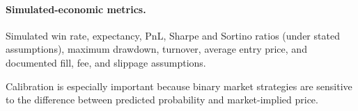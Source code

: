 \paragraph{Simulated-economic metrics.}
Simulated win rate, expectancy, PnL, Sharpe and Sortino ratios (under stated
assumptions), maximum drawdown, turnover, average entry price, and documented
fill, fee, and slippage assumptions.

Calibration is especially important because binary market strategies are
sensitive to the difference between predicted probability and market-implied
price.
